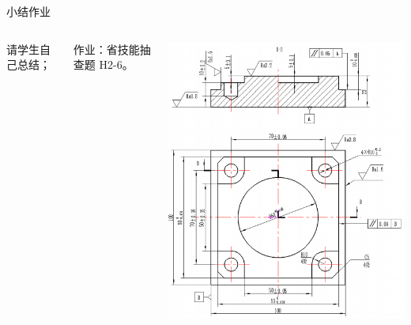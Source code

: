 \documentclass[utf8,zihao=-4,handout,smaller,aspectratio=1610]{ctexbeamer}
\begin{document}
\begin{frame}{小结作业}
	\begin{columns}
		
		请学生自己总结；
		
	   作业：省技能抽查题 H2-6。
		
		\includegraphics[width=\linewidth,trim=0 0 0  0,clip,angle=0]{image/66}~
	\end{columns}
	
\end{frame}
\end{document}
